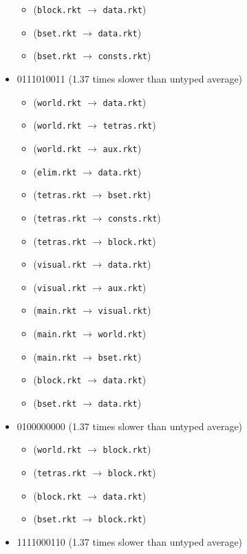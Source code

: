 \documentclass{article}
\newcommand{\mono}[1]{\texttt{#1}}
\begin{document}
\begin{itemize}
\begin{itemize}
  \item (\mono{block.rkt} $\rightarrow$ \mono{data.rkt})
  \item (\mono{bset.rkt} $\rightarrow$ \mono{data.rkt})
  \item (\mono{bset.rkt} $\rightarrow$ \mono{consts.rkt})
  \end{itemize}
\item 0111010011 (1.37 times slower than untyped average)
  \begin{itemize}
  \item (\mono{world.rkt} $\rightarrow$ \mono{data.rkt})
  \item (\mono{world.rkt} $\rightarrow$ \mono{tetras.rkt})
  \item (\mono{world.rkt} $\rightarrow$ \mono{aux.rkt})
  \item (\mono{elim.rkt} $\rightarrow$ \mono{data.rkt})
  \item (\mono{tetras.rkt} $\rightarrow$ \mono{bset.rkt})
  \item (\mono{tetras.rkt} $\rightarrow$ \mono{consts.rkt})
  \item (\mono{tetras.rkt} $\rightarrow$ \mono{block.rkt})
  \item (\mono{visual.rkt} $\rightarrow$ \mono{data.rkt})
  \item (\mono{visual.rkt} $\rightarrow$ \mono{aux.rkt})
  \item (\mono{main.rkt} $\rightarrow$ \mono{visual.rkt})
  \item (\mono{main.rkt} $\rightarrow$ \mono{world.rkt})
  \item (\mono{main.rkt} $\rightarrow$ \mono{bset.rkt})
  \item (\mono{block.rkt} $\rightarrow$ \mono{data.rkt})
  \item (\mono{bset.rkt} $\rightarrow$ \mono{data.rkt})
  \end{itemize}
\item 0100000000 (1.37 times slower than untyped average)
  \begin{itemize}
  \item (\mono{world.rkt} $\rightarrow$ \mono{block.rkt})
  \item (\mono{tetras.rkt} $\rightarrow$ \mono{block.rkt})
  \item (\mono{block.rkt} $\rightarrow$ \mono{data.rkt})
  \item (\mono{bset.rkt} $\rightarrow$ \mono{block.rkt})
  \end{itemize}
\item 1111000110 (1.37 times slower than untyped average)

\end{itemize}
\end{document}
